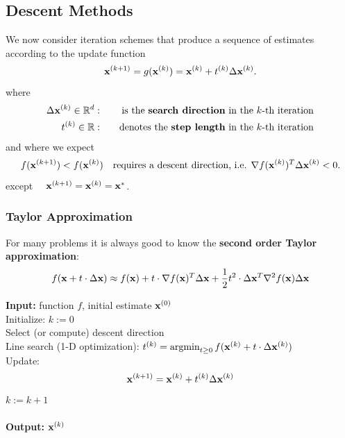 \subsection{Descent Methods}
 We now consider iteration schemes that produce a sequence of estimates \\
  according to the update function  
  \begin{displaymath}
    \bm{\mathrm{x}}^{(k+1)} = g(\bm{\mathrm{x}}^{(k)}) = \bm{\mathrm{x}}^{(k)} + t^{(k)}\Delta \bm{\mathrm{x}}^{(k)} .
  \end{displaymath}  
  where 
%  
  \begin{eqnarray*}
    \Delta \bm{\mathrm{x}}^{(k)}\in \mathbb{R} ^d: & & \quad \mbox{is the   \textbf{search direction} in the $k$-th iteration}\\
    t^{(k)}\in \mathbb{R}:                & & \quad \mbox{denotes the   \textbf{step length} in the $k$-th iteration}
  \end{eqnarray*}  
  and where we expect 
%  
  \begin{displaymath}
    f( \bm{\mathrm{x}}^{(k+1)} ) < f(\bm{\mathrm{x}}^{(k)}) \quad \text{requires a descent direction, i.e. } \nabla f(\bm{\mathrm{x}}^{(k)})^T \Delta \bm{\mathrm{x}}^{(k)} < 0.
  \end{displaymath}  
  except ~~$ \bm{\mathrm{x}}^{(k+1)}=\bm{\mathrm{x}}^{(k)}=\bm{\mathrm{x}}^*$.
  
\subsubsection{Taylor Approximation}
  For many problems it is always good to know the   \textbf{second order Taylor approximation}:
  \begin{displaymath}
    f(\bm{\mathrm{x}} + t\cdot \Delta\bm{\mathrm{x}}) 
    \approx f(\bm{\mathrm{x}}) + t\cdot \nabla f(\bm{\mathrm{x}})^T \Delta \bm{\mathrm{x}} +
      \frac{1}{2} t^2\cdot\Delta \bm{\mathrm{x}}^T \nabla^2 f(\bm{\mathrm{x}})\Delta \bm{\mathrm{x}}
  \end{displaymath}
  \begin{algorithmic}
    \STATE \textbf{Input:} function $f$, initial estimate $\bm{\mathrm{x}}^{(0)}$\\
    \STATE Initialize: $k:=0$\\
    \Repeat
      \STATE Select (or compute) descent direction \\
      \STATE Line search (1-D optimization): $t^{(k)}= \operatorname*{argmin}_{t \geq 0}f(\bm{\mathrm{x}}^{(k)}+t\cdot \Delta\bm{\mathrm{x}}^{(k)})$\\
      \STATE Update:
        \begin{displaymath}
          \bm{\mathrm{x}}^{(k+1)} = \bm{\mathrm{x}}^{(k)} + t^{(k)}\Delta \bm{\mathrm{x}}^{(k)}
        \end{displaymath}
      \STATE $k:=k+1$\\
    \\
    \STATE \textbf{Output:} $\bm{\mathrm{x}}^{(k)}$
  \end{algorithmic}
 
